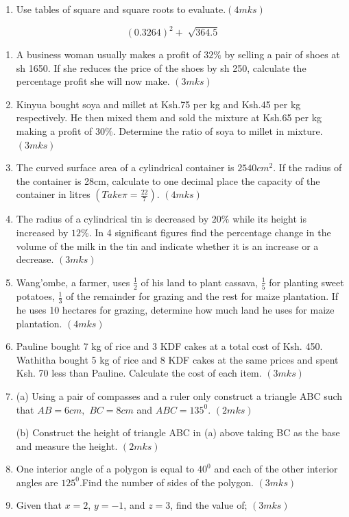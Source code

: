 \documentclass[
  a4paperpaper,
]{scrbook}
\providecommand{\tightlist}{%
  \setlength{\itemsep}{0pt}\setlength{\parskip}{0pt}}\usepackage{longtable,booktabs,array}
\begin{document}
\begin{tcolorbox}
\begin{enumerate}
\def\labelenumi{\arabic{enumi}.}
\setcounter{enumi}{3}
\tightlist
\item
  Use tables of square and square roots to evaluate.\((4mks)\)
\end{enumerate}

\[(0.3264)^2+\sqrt[]{364.5}\]

\begin{enumerate}
\def\labelenumi{\arabic{enumi}.}
\setcounter{enumi}{4}
\item
  A business woman usually makes a profit of \(32\%\) by selling a pair
  of shoes at sh 1650. If she reduces the price of the shoes by sh 250,
  calculate the percentage profit she will now make. \((3mks)\)
\item
  Kinyua bought soya and millet at Ksh.75 per kg and Ksh.45 per kg
  respectively. He then mixed them and sold the mixture at Ksh.65 per kg
  making a profit of \(30\%\). Determine the ratio of soya to millet in
  mixture. \((3mks)\)
\item
  The curved surface area of a cylindrical container is \(2540cm^2\). If
  the radius of the container is 28cm, calculate to one decimal place
  the capacity of the container in litres \((Take \pi=\frac{22}{7} )\).
  \((4mks)\)
\item
  The radius of a cylindrical tin is decreased by \(20\%\) while its
  height is increased by \(12\%\). In 4 significant figures find the
  percentage change in the volume of the milk in the tin and indicate
  whether it is an increase or a decrease. \((3mks)\)
\item
  Wang'ombe, a farmer, uses \(\frac{1}{2}\) of his land to plant
  cassava, \(\frac{1}{5}\) for planting sweet potatoes, \(\frac{1}{3}\)
  of the remainder for grazing and the rest for maize plantation. If he
  uses 10 hectares for grazing, determine how much land he uses for
  maize plantation. \((4mks)\)
\item
  Pauline bought 7 kg of rice and 3 KDF cakes at a total cost of Ksh.
  450. Wathitha bought 5 kg of rice and 8 KDF cakes at the same prices
  and spent Ksh. 70 less than Pauline. Calculate the cost of each item.
  \((3mks)\)
\item
  (a) Using a pair of compasses and a ruler only construct a triangle
  ABC such that \(AB = 6cm,\) \(BC = 8cm\) and \(ABC = 135^0\).
  \((2mks)\)

  (b) Construct the height of triangle ABC in (a) above taking BC as the
  base and measure the height. \((2mks)\)
\item
  One interior angle of a polygon is equal to \(40^0\) and each of the
  other interior angles are \(125^0\).Find the number of sides of the
  polygon. \((3mks)\)
\item
  Given that \(x=2\), \(y=-1\), and \(z=3\), find the value of;
  \((3mks)\)
\end{enumerate}


\end{tcolorbox}
\end{document}
